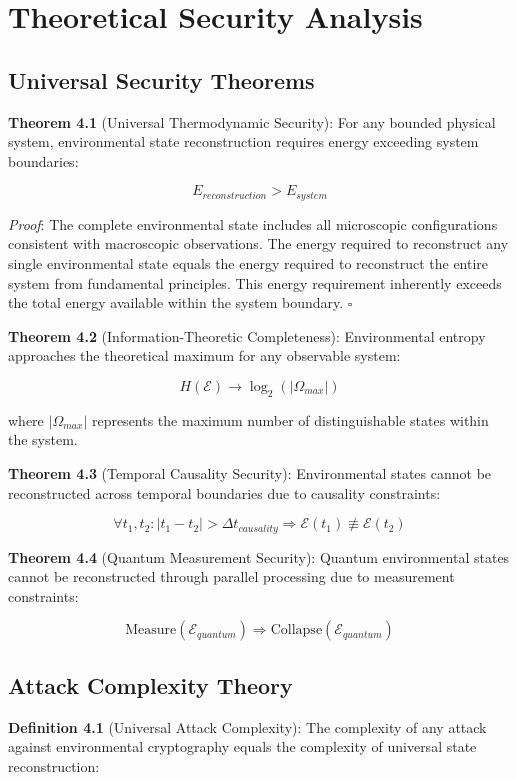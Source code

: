 \documentclass[12pt]{article}
\begin{document}
\section{Theoretical Security Analysis}

\subsection{Universal Security Theorems}

\textbf{Theorem 4.1} (Universal Thermodynamic Security): For any bounded physical system, environmental state reconstruction requires energy exceeding system boundaries:

$$E_{reconstruction} > E_{system}$$

\textit{Proof}: The complete environmental state includes all microscopic configurations consistent with macroscopic observations. The energy required to reconstruct any single environmental state equals the energy required to reconstruct the entire system from fundamental principles. This energy requirement inherently exceeds the total energy available within the system boundary. $\square$

\textbf{Theorem 4.2} (Information-Theoretic Completeness): Environmental entropy approaches the theoretical maximum for any observable system:

$$H(\mathcal{E}) \to \log_2(|\Omega_{max}|)$$

where $|\Omega_{max}|$ represents the maximum number of distinguishable states within the system.

\textbf{Theorem 4.3} (Temporal Causality Security): Environmental states cannot be reconstructed across temporal boundaries due to causality constraints:

$$\forall t_1, t_2 : |t_1 - t_2| > \Delta t_{causality} \Rightarrow \mathcal{E}(t_1) \not\equiv \mathcal{E}(t_2)$$

\textbf{Theorem 4.4} (Quantum Measurement Security): Quantum environmental states cannot be reconstructed through parallel processing due to measurement constraints:

$$\text{Measure}(\mathcal{E}_{quantum}) \Rightarrow \text{Collapse}(\mathcal{E}_{quantum})$$

\subsection{Attack Complexity Theory}

\textbf{Definition 4.1} (Universal Attack Complexity): The complexity of any attack against environmental cryptography equals the complexity of universal state reconstruction:
\end{document}
